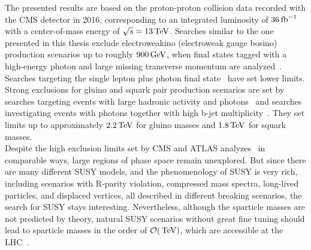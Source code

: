 The presented results are based on the proton-proton collision data recorded with the CMS detector in 2016, corresponding to an integrated luminosity of $36\mbox{\ensuremath{\,\text{fb}^\text{$-$1}}}$ with a center-of-mass energy of $\sqrt{s}=13\,\text{Te\hspace{-.08em}V}$. Searches similar to the one presented in this thesis exclude electroweakino (electroweak gauge bosino) production scenarios up to roughly $900\,\text{Ge\hspace{-.08em}V}$, when final states tagged with a high-energy photon and large missing transverse momentum are analyzed~\cite{PhotonMet}. Searches targeting the single lepton plus photon final state~\cite{PhotonLepton} have set lower limits. Strong exclusions for gluino and squark pair production scenarios are set by searches targeting events with large hadronic activity and photons~\cite{PhotonHT} and searches investigating events with photons together with high b-jet multiplicity~\cite{PhotonBJet}. They set limits up to approximately $2.2\,\text{Te\hspace{-.08em}V}$ for gluino masses and $1.8\,\text{Te\hspace{-.08em}V}$ for squark masses.\\
Despite the high exclusion limits set by CMS and ATLAS analyzes~\cite{AtlasGMSB1,AtlasGMSB2,AtlasGMSB3} in comparable ways, large regions of phase space remain unexplored. But since there are many different SUSY models, and the phenomenology of SUSY is very rich, including scenarios with R-parity violation, compressed mass spectra, long-lived particles, and displaced vertices, all described in different breaking scenarios, the search for SUSY stays interesting. Nevertheless, although the sparticle masses are not predicted by theory, natural SUSY scenarios without great fine tuning should lead to sparticle masses in the order of $\mathcal{O}(\,\text{Te\hspace{-.08em}V})$, which are accessible at the LHC~\cite{SUSYNaturalStatus}.
